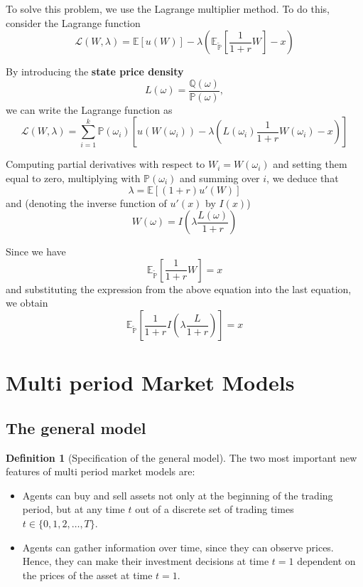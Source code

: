 \documentclass[10pt, oneside, reqno]{amsart}
\theoremstyle{plain}%
\theoremstyle{definition}
\newtheorem{defn}[thm]{Definition}
\theoremstyle{remark}
\newcommand{\expc}[1]{\mathbb{E}\left[#1\right]}
\newcommand{\expp}[1]{\mathbb{E}_{\rnm}\left[#1\right]}
\newcommand{\prob}[1]{\mathbb{P}(#1)}
\newcommand{\Q}{\mathbb{Q}}
\newcommand{\F}{\mathbb{F}}
\newcommand{\rnm}{\tilde{\mathbb{P}}}
\begin{document}
To solve this problem, we use the Lagrange multiplier method.  To do this, consider the Lagrange function \[
	\mathcal{L}(W,\lambda) = \expc{u(W)} - \lambda\left(\expp{\frac{1}{1+r}W} - x \right)
\]

By introducing the \textbf{state price density} \[
	L(\omega) = \frac{\Q(\omega)}{\mathbb{P}(\omega)},
\] we can write the Lagrange function as \[
	\mathcal{L}(W,\lambda) = \sum_{i=1}^k \prob{\omega_i} \left[ u(W(\omega_i)) - \lambda\left(L(\omega_i) \frac{1}{1+r} W(\omega_i) - x \right)\right]
\]

Computing partial derivatives with respect to $W_i = W(\omega_i)$ and setting them equal to zero, multiplying with $\prob{\omega_i}$ and summing over $i$, we deduce that \[
	\lambda = \expc{(1+r) u'(W)}
\] and (denoting the inverse function of $u'(x)$ by $I(x)$) \[
	W(\omega) = I \left(\lambda \frac{L(\omega)}{1+r}\right)
\]

Since we have \[
	\expp{\frac{1}{1+r}W} = x
\] and substituting the expression from the above equation into the last equation, we obtain\[
	\expp{\frac{1}{1+r} I \left(\lambda \frac{L}{1+r}\right)} = x
\]

\renewcommand{\F}{\mathcal{F}}

\newcommand{\ott}{0 \leq t \leq T}

\section{Multi period Market Models} %
\label{sec:multi_period_market_models}
\subsection{The general model} %
\label{sub:the_general_model}


\begin{defn}[Specification of the general model]
	The two most important new features of multi period market models are:
	\begin{itemize}
		\item Agents can buy and sell assets not only at the beginning of the trading period, but at any time $t$ out of a discrete set of trading times $t \in \{0,1,2,\dots,T \}$.
		\item Agents can gather information over time, since they can observe prices.  Hence, they can make their investment decisions at time $t=1$ dependent on the prices of the asset at time $t=1$.
	\end{itemize}
\end{defn}
\end{document}
